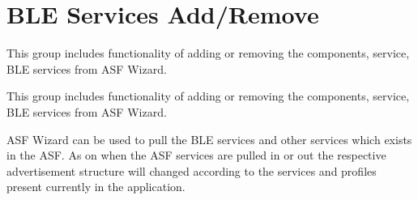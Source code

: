 \hypertarget{group__ble__manager__service__addition}{}\section{B\+LE Services Add/\+Remove}
\label{group__ble__manager__service__addition}


This group includes functionality of adding or removing the components, service, B\+LE services from A\+SF Wizard.  


This group includes functionality of adding or removing the components, service, B\+LE services from A\+SF Wizard. 

A\+SF Wizard can be used to pull the B\+LE services and other services which exists in the A\+SF. As on when the A\+SF services are pulled in or out the respective advertisement structure will changed according to the services and profiles present currently in the application.